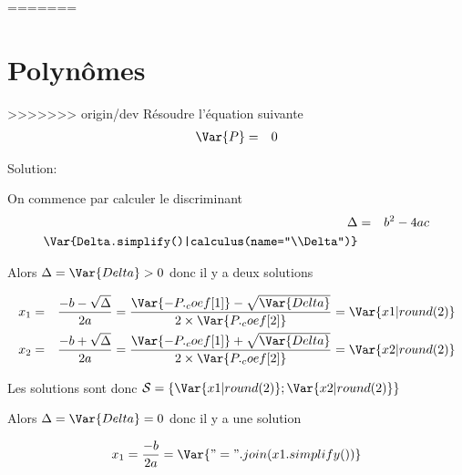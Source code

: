 \documentclass[a4paper,10pt]{article}
\begin{document}
\begin{Exo}
=======

\section{Polynômes}


>>>>>>> origin/dev
    Résoudre l'équation suivante
    \begin{eqnarray*}
        \Var{P} & = & 0
    \end{eqnarray*}

    Solution:

    On commence par calculer le discriminant
    \begin{eqnarray*}
        \Delta & = & b^2-4ac \\
        \Var{Delta.simplify()|calculus(name="\\Delta")}
    \end{eqnarray*}

    Alors $\Delta = \Var{Delta} > 0$ donc il y a deux solutions


    \begin{eqnarray*}
        x_1 & = & \frac{-b - \sqrt{\Delta}}{2a} =  \frac{\Var{-P._coef[1]} - \sqrt{\Var{Delta}}}{2 \times \Var{P._coef[2]}} = \Var{x1 | round(2)} \\
        x_2 & = & \frac{-b + \sqrt{\Delta}}{2a} =  \frac{\Var{-P._coef[1]} + \sqrt{\Var{Delta}}}{2 \times \Var{P._coef[2]}} = \Var{x2 | round(2)}
    \end{eqnarray*}

    Les solutions sont donc $\mathcal{S} = \left\{ \Var{x1|round(2)}; \Var{x2|round(2)} \right\}$

    Alors $\Delta = \Var{Delta} = 0$ donc il y a une solution


    \begin{eqnarray*}
        x_1 = \frac{-b}{2a} = \Var{" = ".join(x1.simplify())}
    \end{eqnarray*}


\end{Exo}
\end{document}
